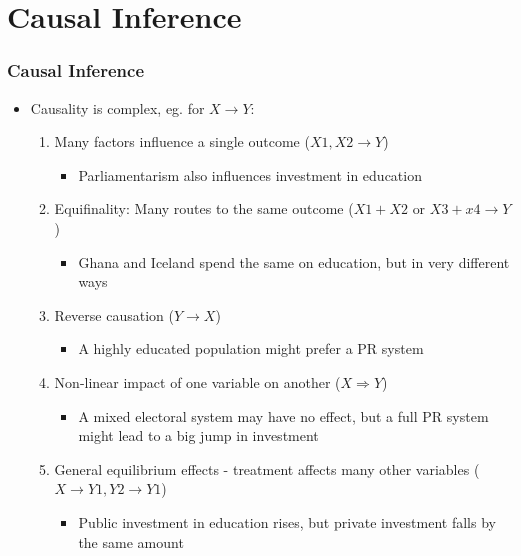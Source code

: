\documentclass[xcolor=x11names,compress]{beamer}\usepackage[]{graphicx}\usepackage[]{color}
\renewcommand{\(}{\begin{columns}}
\renewcommand{\)}{\end{columns}}
\newcommand{\<}[1]{\begin{column}{#1}}
\renewcommand{\>}{\end{column}}
\begin{document}
\section{Causal Inference}

\begin{frame}
\frametitle{Causal Inference}
\begin{itemize}
\item Causality is complex, eg. for $X \rightarrow Y$:
\begin{enumerate}
\item Many factors influence a single outcome ($X1, X2 \rightarrow Y$)
\begin{itemize}
\item Parliamentarism also influences investment in education
\end{itemize}
\item Equifinality: Many routes to the same outcome ($X1+X2 \text{ or } X3+x4 \rightarrow Y$)
\begin{itemize}
\item Ghana and Iceland spend the same on education, but in very different ways
\end{itemize}
\item Reverse causation ($Y \rightarrow X$)
\begin{itemize}
\item A highly educated population might prefer a PR system
\end{itemize}
\item Non-linear impact of one variable on another ($X \Rightarrow Y$)
\begin{itemize}
\item A mixed electoral system may have no effect, but a full PR system might lead to a big jump in investment
\end{itemize}
\item General equilibrium effects - treatment affects many other variables ($X \rightarrow Y1, Y2 \rightarrow Y1$)
\begin{itemize}
\item Public investment in education rises, but private investment falls by the same amount
\end{itemize}
\end{enumerate}
\end{itemize}
\end{frame}
\end{document}

